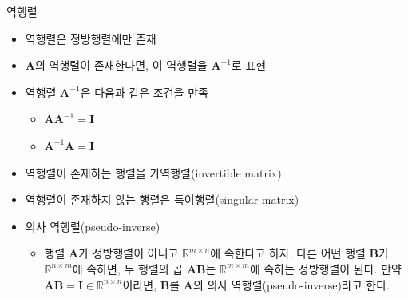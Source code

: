 \begin{frame}{역행렬}


\begin{itemize}
\item 역행렬은 정방행렬에만 존재
\item $\mathbf A$의 역행렬이 존재한다면, 이 역행렬을 $\mathbf A^{-1}$로 표현
\item 역행렬 $\mathbf A^{-1}$은 다음과 같은 조건을 만족
	\begin{itemize}
	\item $\mathbf {AA}^{-1} = \mathbf I$
	\item $\mathbf A^{-1} \mathbf A = \mathbf I$
	\end{itemize}
\end{itemize}

\begin{itemize}
\item 역행렬이 존재하는 행렬을 가역행렬(invertible matrix)
\item 역행렬이 존재하지 않는 행렬은 특이행렬(singular matrix)
\end{itemize}

\begin{itemize}
\item 의사 역행렬(pseudo-inverse)
	\begin{itemize}
	\item  행렬 $\mathbf A$가 정방행렬이 아니고 $\mathbb R^{m \times n}$에 속한다고 하자. 다른 어떤 행렬 $\mathbf B$가 $\mathbb R^{n \times m}$에 속하면, 두 행렬의 곱 $\mathbf {AB}$는 $\mathbb R^{m \times m}$에 속하는 정방행렬이 된다. 만약 $\mathbf {AB} = \mathbf I \in \mathbb R^{n \times n}$이라면, $\mathbf B$를 $\mathbf A$의 의사 역행렬(pseudo-inverse)라고 한다.
	\end{itemize}
\end{itemize}
\end{frame}


